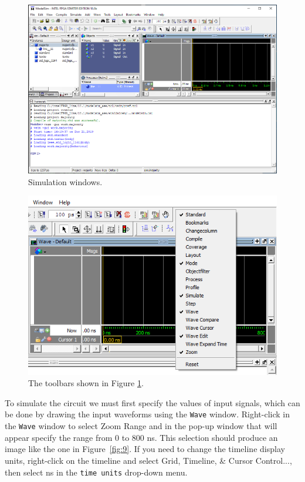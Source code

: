 \documentclass[11pt, twoside, pdftex]{article}
\begin{document}
\begin{figure}[H]
   \begin{center}
      \includegraphics[width=\textwidth]{figures/sim_mode.png}
   \caption{Simulation windows.} 
	 \label{fig:8}
	 \end{center}
\end{figure}

\begin{figure}[H]
   \begin{center}
      \includegraphics[scale=1.50]{figures/toolbar.png}
       \caption{The toolbars shown in Figure \ref{fig:8}.} 
	 \label{fig:toolbars}
	 \end{center}
\end{figure}

To simulate the circuit we must first specify the values of input signals, which can be done 
by drawing the input waveforms using the \texttt{Wave} window. Right-click in the \texttt{Wave}
window to select {\sf Zoom Range} and in the pop-up window that will appear specify the range 
from 0 to 800 ns. This selection should produce an image like the one in Figure~\ref{fig:9}.
If you need to change the timeline display units, right-click on the timeline and select 
{\sf Grid, Timeline, \& Cursor Control...}, then select {\sf ns} in the 
\texttt{time units} drop-down menu.
\end{document}
